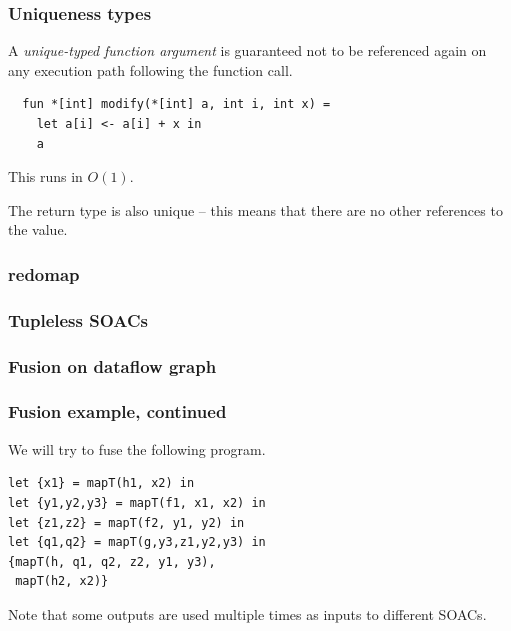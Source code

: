 \documentclass{beamer}
\begin{document}
\begin{frame}[fragile]
  \frametitle{Uniqueness types}

  A \textit{unique-typed function argument} is guaranteed not to be
  referenced again on any execution path following the function call.

\begin{lstlisting}
  fun *[int] modify(*[int] a, int i, int x) =
    let a[i] <- a[i] + x in
    a
\end{lstlisting}

This runs in $O(1)$.

The return type is also unique -- this means that there are no other
references to the value.
\end{frame}

\begin{frame}
\frametitle{\textbf{redomap}}
\end{frame}

\begin{frame}
\frametitle{Tupleless SOACs}
\end{frame}

\begin{frame}
\frametitle{Fusion on dataflow graph}

\end{frame}

\begin{frame}[fragile]
\frametitle{Fusion example, continued}

We will try to fuse the following program.

\begin{lstlisting}
let {x1} = mapT(h1, x2) in
let {y1,y2,y3} = mapT(f1, x1, x2) in
let {z1,z2} = mapT(f2, y1, y2) in
let {q1,q2} = mapT(g,y3,z1,y2,y3) in
{mapT(h, q1, q2, z2, y1, y3),
 mapT(h2, x2)}
\end{lstlisting}

Note that some outputs are used multiple times as inputs to different
SOACs.

\end{frame}
\end{document}
